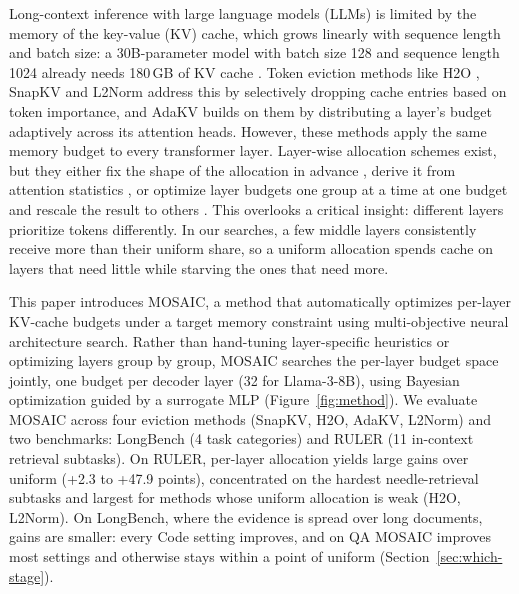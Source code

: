\documentclass[11pt]{article}
\begin{document}
Long-context inference with large language models (LLMs) is limited by the memory of the key-value (KV) cache, which grows linearly with sequence length and batch size: a 30B-parameter model with batch size 128 and sequence length 1024 already needs 180\,GB of KV cache \citep{zhang2023h2o}. Token eviction methods like H2O \citep{zhang2023h2o}, SnapKV \citep{li2024snapkv} and L2Norm \citep{devoto2024l2norm} address this by selectively dropping cache entries based on token importance, and AdaKV \citep{feng2025adakv} builds on them by distributing a layer's budget adaptively across its attention heads. However, these methods apply the same memory budget to every transformer layer. Layer-wise allocation schemes exist, but they either fix the shape of the allocation in advance \citep{cai2025pyramidkv}, derive it from attention statistics \citep{qin2025cake}, or optimize layer budgets one group at a time at one budget and rescale the result to others \citep{yu2025evolkv}. This overlooks a critical insight: different layers prioritize tokens differently. In our searches, a few middle layers consistently receive more than their uniform share, so a uniform allocation spends cache on layers that need little while starving the ones that need more.

This paper introduces MOSAIC, a method that automatically optimizes per-layer KV-cache budgets under a target memory constraint using multi-objective neural architecture search. Rather than hand-tuning layer-specific heuristics or optimizing layers group by group, MOSAIC searches the per-layer budget space jointly, one budget per decoder layer (32 for Llama-3-8B), using Bayesian optimization guided by a surrogate MLP (Figure~\ref{fig:method}). We evaluate MOSAIC across four eviction methods (SnapKV, H2O, AdaKV, L2Norm) and two benchmarks: LongBench (4 task categories) and RULER (11 in-context retrieval subtasks). On RULER, per-layer allocation yields large gains over uniform (+2.3 to +47.9 points), concentrated on the hardest needle-retrieval subtasks and largest for methods whose uniform allocation is weak (H2O, L2Norm). On LongBench, where the evidence is spread over long documents, gains are smaller: every Code setting improves, and on QA MOSAIC improves most settings and otherwise stays within a point of uniform (Section~\ref{sec:which-stage}).
\end{document}
